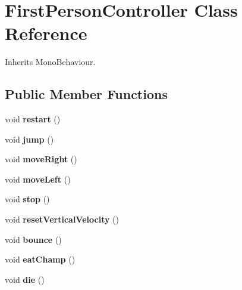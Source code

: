 \hypertarget{class_first_person_controller}{\section{First\-Person\-Controller Class Reference}
\label{class_first_person_controller}
}


Inherits Mono\-Behaviour.

\subsection*{Public Member Functions}
\begin{DoxyCompactItemize}
\item 
\hypertarget{class_first_person_controller_a6863c276103694ce3a2f21ac65ca35ac}{void {\bfseries restart} ()}\label{class_first_person_controller_a6863c276103694ce3a2f21ac65ca35ac}

\item 
\hypertarget{class_first_person_controller_af5a74b5993bb8c7628b2c0ae14bd4c0f}{void {\bfseries jump} ()}\label{class_first_person_controller_af5a74b5993bb8c7628b2c0ae14bd4c0f}

\item 
\hypertarget{class_first_person_controller_a00f44243ff42fac847affb3630c2edcd}{void {\bfseries move\-Right} ()}\label{class_first_person_controller_a00f44243ff42fac847affb3630c2edcd}

\item 
\hypertarget{class_first_person_controller_a0f882ae834218e97b0415ea3ee5039d0}{void {\bfseries move\-Left} ()}\label{class_first_person_controller_a0f882ae834218e97b0415ea3ee5039d0}

\item 
\hypertarget{class_first_person_controller_ad2e116e9ed58c004abf900c35c1061fe}{void {\bfseries stop} ()}\label{class_first_person_controller_ad2e116e9ed58c004abf900c35c1061fe}

\item 
\hypertarget{class_first_person_controller_a31b812cebe9fc36b417774d7972e5d9c}{void {\bfseries reset\-Vertical\-Velocity} ()}\label{class_first_person_controller_a31b812cebe9fc36b417774d7972e5d9c}

\item 
\hypertarget{class_first_person_controller_a8a347e3d406213316afc8e66166087f5}{void {\bfseries bounce} ()}\label{class_first_person_controller_a8a347e3d406213316afc8e66166087f5}

\item 
\hypertarget{class_first_person_controller_afd45e61e5e9abbddeffc086e6cede2ad}{void {\bfseries eat\-Champ} ()}\label{class_first_person_controller_afd45e61e5e9abbddeffc086e6cede2ad}

\item 
\hypertarget{class_first_person_controller_ae1b646d4a75ef90e25d64908471da36e}{void {\bfseries die} ()}\label{class_first_person_controller_ae1b646d4a75ef90e25d64908471da36e}

\end{DoxyCompactItemize}
